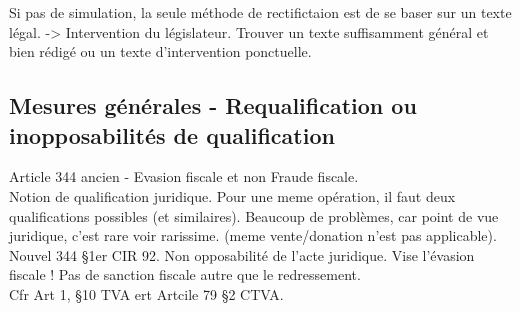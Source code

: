\documentclass{book}
\begin{document}
Si pas de simulation, la seule méthode de rectifictaion est de se baser sur un texte légal. -> Intervention du législateur. Trouver un texte suffisamment général et bien rédigé ou un texte d'intervention ponctuelle.

\subsection{Mesures générales - Requalification ou inopposabilités de qualification}

Article 344 ancien - Evasion fiscale et non Fraude fiscale.\\

Notion de qualification juridique. Pour une meme opération, il faut deux qualifications possibles (et similaires). Beaucoup de problèmes, car point de vue juridique, c'est rare voir rarissime. (meme vente/donation n'est pas applicable).\\

Nouvel 344 §1er CIR 92. Non opposabilité de l'acte juridique. Vise l'évasion fiscale ! Pas de sanction fiscale autre que le redressement.\\

Cfr Art 1, §10 TVA ert Artcile 79 §2 CTVA.\\







   
\nocite{*}

\end{document}
